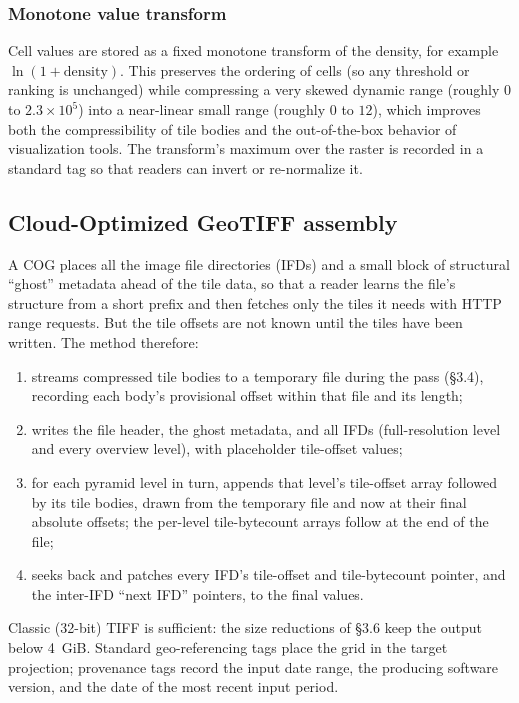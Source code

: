 \documentclass[10pt,twocolumn]{article}
\begin{document}
\subsubsection{Monotone value transform}

Cell values are stored as a fixed monotone transform of the density, for
example $\ln(1 + \text{density})$. This preserves the ordering of cells (so any
threshold or ranking is unchanged) while compressing a very skewed dynamic
range (roughly $0$ to $2.3 \times 10^{5}$) into a near-linear small range
(roughly $0$ to $12$), which improves both the compressibility of tile bodies
and the out-of-the-box behavior of visualization tools. The transform's
maximum over the raster is recorded in a standard tag so that readers can
invert or re-normalize it.

\subsection{Cloud-Optimized GeoTIFF assembly}

A COG places all the image file directories (IFDs) and a small block of
structural \enquote{ghost} metadata ahead of the tile data, so that a reader
learns the file's structure from a short prefix and then fetches only the tiles
it needs with HTTP range requests. But the tile offsets are not known until the
tiles have been written. The method therefore:

\begin{enumerate}
\item streams compressed tile bodies to a temporary file during the pass
  (\S3.4), recording each body's provisional offset within that file and its
  length;
\item writes the file header, the ghost metadata, and all IFDs (full-resolution
  level and every overview level), with placeholder tile-offset values;
\item for each pyramid level in turn, appends that level's tile-offset array
  followed by its tile bodies, drawn from the temporary file and now at their
  final absolute offsets; the per-level tile-bytecount arrays follow at the end
  of the file;
\item seeks back and patches every IFD's tile-offset and tile-bytecount
  pointer, and the inter-IFD \enquote{next IFD} pointers, to the final values.
\end{enumerate}

Classic (32-bit) TIFF is sufficient: the size reductions of \S3.6 keep the
output below 4~GiB. Standard geo-referencing tags place the grid in the target
projection; provenance tags record the input date range, the producing software
version, and the date of the most recent input period.
\end{document}
